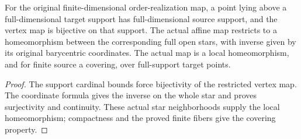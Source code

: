 \begin{proposition}
  \label{prop:actual-full-star-coverings}
  \leanok
  For the original finite-dimensional order-realization map, a point lying above a full-dimensional target support has full-dimensional source support, and the vertex map is bijective on that support. The actual affine map restricts to a homeomorphism between the corresponding full open stars, with inverse given by its original barycentric coordinates. The actual map is a local homeomorphism, and for finite source a covering, over full-support target points.
\end{proposition}
\begin{proof}
  The support cardinal bounds force bijectivity of the restricted vertex map. The coordinate formula gives the inverse on the whole star and proves surjectivity and continuity. These actual star neighborhoods supply the local homeomorphism; compactness and the proved finite fibers give the covering property.
  \leanok
\end{proof}

